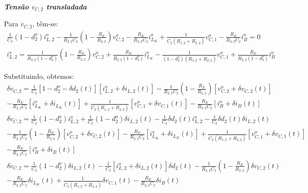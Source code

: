 \textbf{\textit{Tensão $v_{C,2}$ transladada}} \vspace*{12pt}

Para $\dot{v}_{C,2}$, têm-se:
\begin{gather*}
  \frac{1}{C_2} \left(1 - d_2^o\right) i_{L,2}^o - \frac{1}{R_{2,2}C_2} \left(1 - \frac{R_E}{R_{2,2}}\right) v_{C,2}^o - \frac{R_E}{R_{2,2} C_2} i_{L_K}^o + \frac{1}{C_2(R_{1,2} + R_{2,2})} v_{C,1}^o - \frac{R_E}{R_{2,2}C_2} i_B^o= 0
\end{gather*}
\begin{gather}
  i_{L,2}^o = \frac{1}{R_{2,2} \left(1 - d_2^o\right)} \left(1 - \frac{R_E}{R_{2,2}}\right) v_{C,2}^o + \frac{R_E}{R_{2,2} \left(1 - d_2^o\right)} i_{L_K}^o - \frac{1}{\left(1 - d_2^o\right) (R_{1,2} + R_{2,2})} v_{C,1}^o + \frac{R_E}{R_{2,2}\left(1 - d_2^o\right)} i_B^o
\end{gather}

Substituindo, obtemos:
\begin{multline*}
  \delta \dot v_{C,2} = \frac{1}{C_2} \left[1 - d_2^o - \delta d_2(t)\right] \left[i_{L,2}^o + \delta i_{L,2}(t)\right]
  - \frac{1}{R_{2,2}C_2} \left(1 - \frac{R_E}{R_{2,2}}\right) \left[v_{C,2}^o + \delta v_{C,2}(t)\right] \\
  - \frac{R_E}{R_{2,2} C_2} \left[i_{L_K}^o + \delta i_{L_K}(t)\right] + \frac{1}{C_2(R_{1,2} + R_{2,2})} \left[v_{C,1}^o + \delta v_{C,1}(t)\right] - \frac{R_E}{R_{2,2} C_2} \left[i_B^o + \delta i_B(t)\right]
\end{multline*}
\begin{multline*}
  \delta \dot v_{C,2} = \frac{1}{C_2} (1 - d_2^o) i_{L,2}^o + \frac{1}{C_2} (1 - d_2^o) \delta i_{L,2}(t) - \frac{1}{C_2} \delta d_2(t) i_{L,2}^o - \frac{1}{C_2} \delta d_2(t) \delta i_{L,2}(t)\\
  - \frac{1}{R_{2,2}C_2} \left(1 - \frac{R_E}{R_{2,2}}\right) \left[v_{C,2}^o + \delta v_{C,2}(t)\right]
  - \frac{R_E}{R_{2,2} C_2} \left[i_{L_K}^o + \delta i_{L_K}(t)\right] + \frac{1}{C_2(R_{1,2} + R_{2,2})} \left[v_{C,1}^o + \delta v_{C,1}(t)\right] \\
  - \frac{R_E}{R_{2,2} C_2} \left[i_B^o + \delta i_B(t)\right]
\end{multline*}
\begin{multline*}
  \delta \dot v_{C,2} = \frac{1}{C_2} (1 - d_2^o) \delta i_{L,2}(t) - \frac{1}{C_2} \left[i_{L,2}^o + \delta i_{L,2}(t)\right] \delta d_2(t)
  - \frac{1}{R_{2,2}C_2} \left(1 - \frac{R_E}{R_{2,2}}\right) \delta v_{C,2}(t)  \\
  - \frac{R_E}{R_{2,2} C_2} \delta i_{L_K}(t) + \frac{1}{C_2(R_{1,2} + R_{2,2})}  \delta v_{C,1}(t) - \frac{R_E}{R_{2,2} C_2} \delta i_B(t)
\end{multline*}


